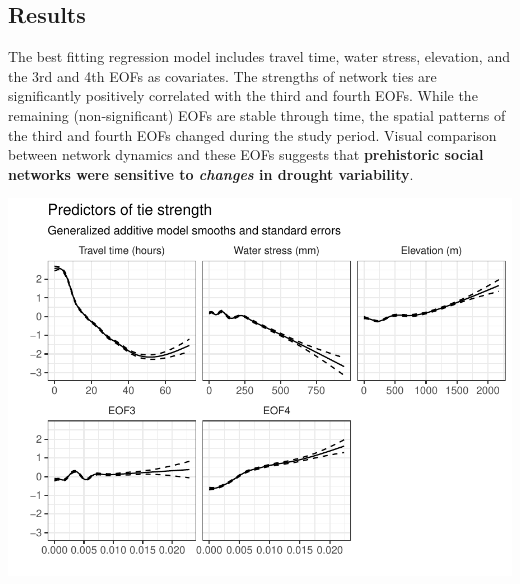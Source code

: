 \documentclass[a0,final]{a0poster}
\begin{document}
\begin{multicols}{3}
\columnbreak





\columnbreak
\section*{Results}
\begin{multicols}{2}
\vspace*{\fill}
    The best fitting regression model includes travel time, water stress, elevation, and the 3rd and 4th EOFs as covariates. The strengths of network ties are significantly positively correlated with the third and fourth EOFs. While the remaining (non-significant) EOFs are stable through time, the spatial patterns of the third and fourth EOFs changed during the study period. Visual comparison between network dynamics and these EOFs suggests that \textbf{prehistoric social networks were sensitive to \textit{changes} in drought variability}.
\vspace*{\fill}

\columnbreak
    \includegraphics[width = \columnwidth]{images/smooths}

\end{multicols}

\vspace*{\fill}


\end{multicols}
\end{document}
